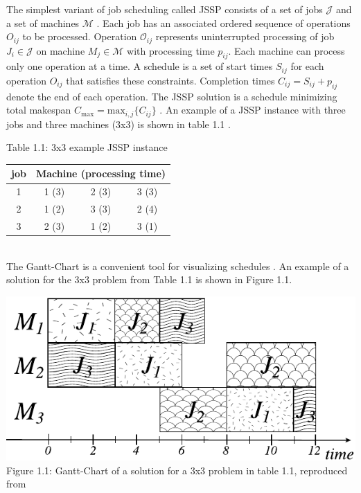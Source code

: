 The simplest variant of job scheduling called JSSP consists of a set of jobs $\mathcal{J}$ and a set of machines $\mathcal{M}$ \cite{YamadaNakanoJSSP}. Each job has an associated ordered sequence of operations $O_{ij}$ to be processed. Operation $\mathcal{O}_{ij}$ represents uninterrupted processing of job $J_i \in \mathcal{J}$ on machine $M_j \in \mathcal{M}$ with processing time $p_{ij}$. Each machine can process only one operation at a time. A schedule is a set of start times $S_{ij}$ for each operation $O_{ij}$ that satisfies these constraints. Completion times $C_{ij} = S_{ij} + p_{ij}$ denote the end of each operation. The JSSP solution is a schedule minimizing total makespan $C_\text{max} = \text{max}_{i,j} \{C_{ij}\}$ \cite{zhang2020learning}. An example of a JSSP instance with three jobs and three machines (3x3) is shown in table 1.1 \cite{YamadaNakanoJSSP}.
\begin{table}[htbp]
    Table 1.1: 3x3 example JSSP instance \cite{YamadaNakanoJSSP}\\
    \vspace{1mm}
    \begin{tabular}{cccc}
    \hline
    job & \multicolumn{3}{c}{Machine (processing time)} \\ \hline
    1   & 1 (3)             & 2 (3)             & 3 (3)            \\
    2   & 1 (2)             & 3 (3)             & 2 (4)            \\
    3   & 2 (3)             & 1 (2)             & 3 (1)            \\ \hline
    \end{tabular}
\end{table}\\
The Gantt-Chart is a convenient tool for visualizing schedules \cite{WILSON2003430}. An example of a solution for the 3x3 problem from Table 1.1 is shown in Figure 1.1.
\begin{center}
    \includegraphics[width=0.8\linewidth]{images/gantt-charrt.pdf}\\
    Figure 1.1: Gantt-Chart of a solution for a 3x3 problem in table 1.1, reproduced from \cite{YamadaNakanoJSSP}
\end{center}


